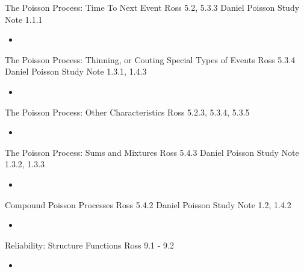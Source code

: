 \documentclass[12pt, titlepage, french]{report}
\begin{document}
\begin{CHPT_SUMM_AUTO_NUMB}[label = {L.-12}]{The Poisson Process: Time To Next Event}
Ross 5.2, 5.3.3
Daniel Poisson Study Note 1.1.1
	\begin{itemize}
		\item	
	\end{itemize}
\end{CHPT_SUMM_AUTO_NUMB}

\begin{CHPT_SUMM_AUTO_NUMB}[label = {L.-13}]{{The Poisson Process: Thinning, or Couting Special Types of Events}}
Ross 5.3.4
Daniel Poisson Study Note 1.3.1, 1.4.3
	\begin{itemize}
		\item	
	\end{itemize}
\end{CHPT_SUMM_AUTO_NUMB}

\begin{CHPT_SUMM_AUTO_NUMB}[label = {L.-14}]{The Poisson Process: Other Characteristics}
Ross 5.2.3, 5.3.4, 5.3.5
	\begin{itemize}
		\item	
	\end{itemize}
\end{CHPT_SUMM_AUTO_NUMB}

\begin{CHPT_SUMM_AUTO_NUMB}[label = {L.-15}]{The Poisson Process: Sums and Mixtures}
Ross 5.4.3
Daniel Poisson Study Note 1.3.2, 1.3.3
	\begin{itemize}
		\item	
	\end{itemize}
\end{CHPT_SUMM_AUTO_NUMB}

\begin{CHPT_SUMM_AUTO_NUMB}[label = {L.-16}]{Compound Poisson Processes}
Ross 5.4.2
Daniel Poisson Study Note 1.2, 1.4.2
	\begin{itemize}
		\item	
	\end{itemize}
\end{CHPT_SUMM_AUTO_NUMB}

\begin{CHPT_SUMM_AUTO_NUMB}[label = {L.-17}]{Reliability: Structure Functions}
Ross 9.1 - 9.2
	\begin{itemize}
		\item	
	\end{itemize}
\end{CHPT_SUMM_AUTO_NUMB}
\end{document}
